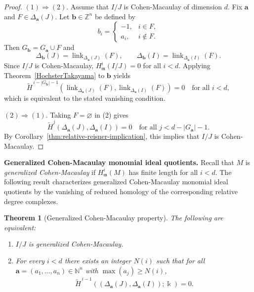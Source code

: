 \documentclass[12pt]{amsart}
\numberwithin{equation}{section}
\newtheorem{theorem}{Theorem}[section]
\theoremstyle{definition}
\theoremstyle{definition}
\DeclareMathOperator{\link}{link}
\newcommand{\ZZ}{{\mathbb Z}}
\newcommand{\NN}{{\mathbb N}}
\def\kk{{\Bbbk}}
\def\mm{{\mathfrak m}}
\begin{document}
\begin{proof}
	$(1)\Longrightarrow(2)$.
	Assume that $I/J$ is Cohen-Macaulay of dimension $d$.
	Fix $\mathbf a$ and $F\in\Delta_{\mathbf a}(J)$.
	Let $\mathbf b\in\ZZ^n$ be defined by
	\[
	b_i=
	\begin{cases}
		-1,& i\in F,\\
		a_i,& i\notin F.
	\end{cases}
	\]
	Then $G_{\mathbf b}=G_{\mathbf a}\cup F$ and
	\[
	\Delta_{\mathbf b}(J)=\link_{\Delta_{\mathbf a}(J)}(F),
	\qquad
	\Delta_{\mathbf b}(I)=\link_{\Delta_{\mathbf a}(I)}(F).
	\]
	Since $I/J$ is Cohen-Macaulay, $H^i_{\mm}(I/J)=0$ for all $i<d$.
	Applying Theorem~\ref{HochsterTakayama} to $\mathbf b$ yields
	\[
	\widetilde H^{\,i-|G_{\mathbf b}|-1}
	\!\left(
	\link_{\Delta_{\mathbf a}(J)}(F),
	\link_{\Delta_{\mathbf a}(I)}(F)
	\right)=0
	\quad\text{for all } i<d,
	\]
	which is equivalent to the stated vanishing condition.
	
	\smallskip
	$(2)\Longrightarrow(1)$.
	Taking $F=\varnothing$ in (2) gives
	\[
	\widetilde H^j\!\left(\Delta_{\mathbf a}(J),\Delta_{\mathbf a}(I)\right)=0
	\quad\text{for all } j< d-|G_{\mathbf a}|-1.
	\]
	By Corollary~\ref{thm:relative-reisner-implication}, this implies that
	$I/J$ is Cohen-Macaulay.
\end{proof}


\medskip

\noindent\textbf{Generalized Cohen-Macaulay monomial ideal quotients.} 
Recall that $M$ is \emph{generalized Cohen-Macaulay} if $H^i_{\mm}(M)$ has finite length for all $i<d$. The following result characterizes generalized Cohen-Macaulay monomial ideal quotients by the vanishing of reduced homology of the corresponding relative degree complexes.

\begin{theorem}[Generalized Cohen-Macaulay property]\label{thm:gCM-criterion}
	The following are equivalent:
	\begin{enumerate}
		\item $I/J$ is generalized Cohen-Macaulay.
		\item For every $i<d$ there exists an integer $N(i)$ such that for all $\mathbf{a} = (a_1, \dots, a_n) \in\NN^n$
		with $\max(a_j) \ge N(i)$,
		\[
		\widetilde H^{\,i-1}\!\left((\Delta_{\mathbf a}(J),\Delta_{\mathbf a}(I));\kk\right)=0.
		\]
	\end{enumerate}
\end{theorem}
\end{document}
